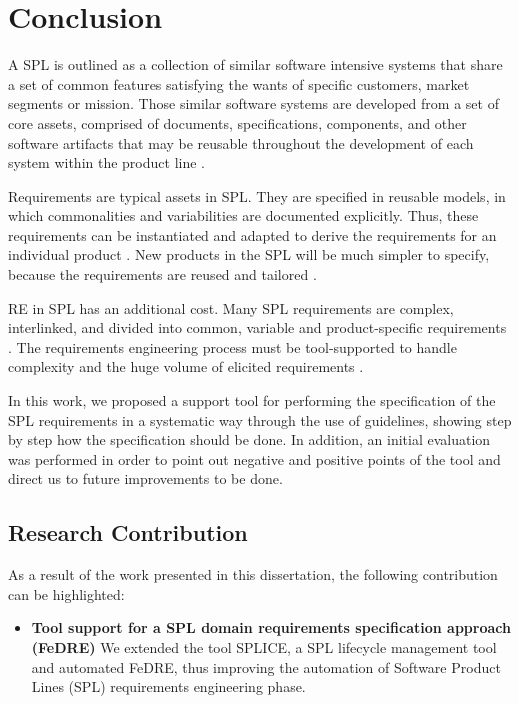 \chapter{Conclusion}
\label{ch:conclusion}

A \acf{SPL} is outlined as a collection of similar software intensive systems
that share a set of common features satisfying the wants of specific customers, market segments 
or mission. Those similar software systems are developed from a set of core assets, comprised of 
documents, specifications, components, and other software artifacts that may be reusable throughout 
the development of each system within the product line
\citep{rafael2013systems}.

Requirements are typical assets in \ac{SPL}. They are specified in reusable models,
in which commonalities and variabilities are documented explicitly. Thus, these 
requirements can be instantiated and adapted to derive the requirements for an 
individual product \citep{cheng2007research}. New products in the SPL will be
much simpler to specify, because the requirements are reused and tailored
\citep{clements2002software}.

\acf{RE} in \ac{SPL} has an additional cost. Many \ac{SPL} requirements are
complex, interlinked, and divided into common, variable and product-specific requirements 
\citep{birk2003report,de2014defining}.  The requirements engineering process
must be tool-supported to handle complexity and the huge volume of elicited requirements
\citep{birk2003report}.

In this work, we proposed a support tool for performing the
specification of the \ac{SPL} requirements in a systematic way through the use of guidelines,  
showing step by step how the specification should be done. In addition, an
initial evaluation was performed in order to point out negative and positive
points of the tool and direct us to future improvements to be done.

\section{Research Contribution}
\label{sc:reserach-contrib}
As a result of the work presented in this dissertation, the following contribution can be highlighted:
\begin{itemize}
\item \textbf{Tool support for a SPL domain requirements specification approach
(FeDRE)} 
We extended the tool \ac{SPLICE}, a \ac{SPL} lifecycle management tool
and automated \acf{FeDRE}, thus improving the automation of Software Product Lines (\ac{SPL}) 
requirements engineering phase.
\end{itemize}

